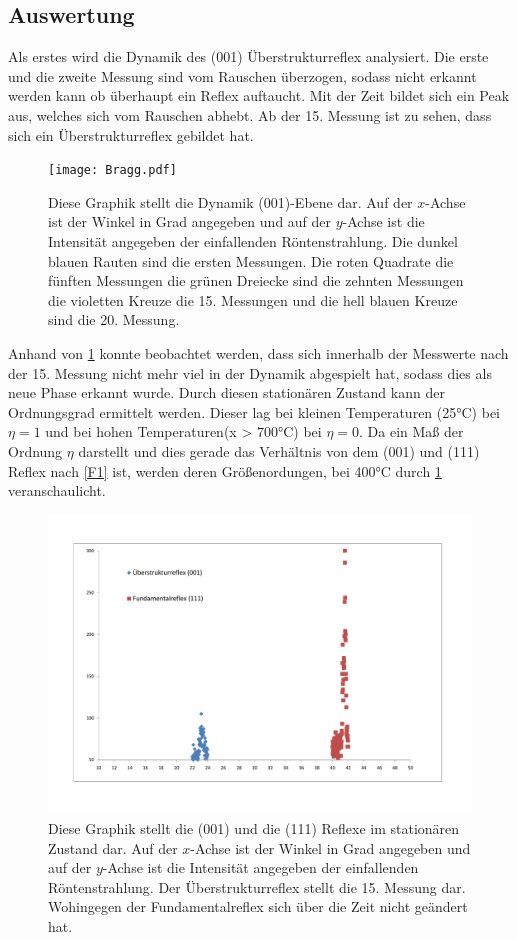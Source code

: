 \documentclass[
	a4paper,
	12pt,
	pagesize,
	ngerman
]{scrartcl}
\begin{document}
\subsection{Auswertung}
Als erstes wird die Dynamik des (001) Überstrukturreflex analysiert. Die erste und die zweite Messung sind vom Rauschen überzogen, sodass nicht erkannt werden kann ob überhaupt ein Reflex auftaucht. Mit der Zeit bildet sich ein Peak aus, welches sich vom Rauschen abhebt. Ab der 15. Messung ist zu sehen, dass sich ein Überstrukturreflex gebildet hat.
\begin{figure}[h!]
    \centering
    \texttt{[image: Bragg.pdf]}
    \caption{Diese Graphik stellt die Dynamik (001)-Ebene dar. Auf der $x$-Achse ist der Winkel in Grad angegeben und auf der $y$-Achse ist die Intensität angegeben der einfallenden Röntenstrahlung. Die dunkel blauen Rauten sind die ersten Messungen. Die roten Quadrate die fünften Messungen die grünen Dreiecke sind die zehnten Messungen die violetten Kreuze die 15. Messungen und die hell blauen Kreuze sind die 20. Messung.}
    \label{A3}
\end{figure}
Anhand von \cref{A3} konnte beobachtet werden, dass sich innerhalb der Messwerte nach der 15. Messung nicht mehr viel in der Dynamik abgespielt hat, sodass dies als neue Phase erkannt wurde. Durch diesen stationären Zustand kann der Ordnungsgrad ermittelt werden. Dieser lag bei kleinen Temperaturen (25°C) bei $\eta = 1$ und bei hohen Temperaturen(x > 700°C) bei $\eta = 0$. Da ein Maß der Ordnung $\eta$ darstellt und dies gerade das Verhältnis von dem (001) und (111) Reflex nach \cref{F1} ist, werden deren Größenordungen, bei 400°C durch \cref{A3} veranschaulicht.
\begin{figure}[h!]
    \centering
    \includegraphics[scale = 0.6]{001 und 111.pdf}
    \caption{Diese Graphik stellt die (001) und die (111) Reflexe im stationären Zustand dar. Auf der $x$-Achse ist der Winkel in Grad angegeben und auf der $y$-Achse ist die Intensität angegeben der einfallenden Röntenstrahlung. Der Überstrukturreflex stellt die 15. Messung dar. Wohingegen der Fundamentalreflex sich über die Zeit nicht geändert hat.}
    \label{A4}
\end{figure}
\end{document}
